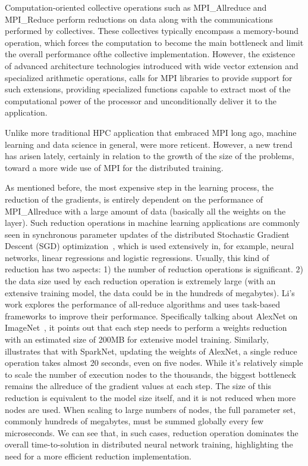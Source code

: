 \documentclass[sigconf]{acmart}
\newcommand{\mpi}[0]{\textsc{MPI}\xspace}
\newcommand{\sve}[0]{\textsc{SVE}\xspace}
\begin{document}
Computation-oriented collective operations such as MPI\_Allreduce and MPI\_Reduce perform reductions on
data along with the communications performed by collectives.
These collectives typically encompass a memory-bound operation, which forces
the computation to become the main bottleneck and limit the overall performance ofthe collective implementation.
However, the existence of advanced architecture technologies introduced
with wide vector extension and specialized arithmetic operations, calls for
MPI libraries to provide support for such extensions, providing specialized functions
capable to extract most of the computational power of the processor and unconditionally deliver it to the application.


Unlike more traditional HPC application that embraced MPI long ago,
machine learning and data science in general, were more reticent. However,
a new trend has arisen lately, certainly in relation to the growth
of the size of the problems, toward a more wide use of \mpi for the distributed training.

As mentioned before, the most expensive step in the learning process, the reduction of the gradients, is entirely dependent on the performance of MPI\_Allreduce with a large amount of data (basically all the weights on the layer).
Such reduction operations in machine learning applications
are commonly seen in synchronous parameter updates of the distributed Stochastic
Gradient Descent (SGD) optimization~\cite{sgd10}, which is used extensively
in, for example, neural networks, linear regressions and logistic
regressions. Usually, this kind of reduction has two aspects: 1) the number of reduction
operations is significant. 2) the data size used by each reduction operation is extremely large (with an extensive training model, the data could be in the hundreds of megabytes).
%
Li's~\cite{inproceedings} work explores the performance of all-reduce algorithms
and uses task-based frameworks to improve their performance. Specifically talking about AlexNet on ImageNet~\cite{NIPS2012_4824}, it points out that
each step needs to perform a weights reduction with an estimated size
of 200MB for extensive model training.
%
Similarly, \cite{moritz2015sparknet}
illustrates that with SparkNet, updating the weights of AlexNet, a single reduce
operation takes almost 20 seconds, even on five nodes. While it's relatively simple to scale
the number of execution nodes to the thousands, the biggest bottleneck remains the allreduce of
the gradient values at each step. The size of this reduction is equivalent
to the model size itself, and it is not reduced when more
nodes are used. When scaling to large numbers of nodes, the full parameter set, commonly hundreds of
megabytes, must be summed globally every few microseconds. We can see that, in such cases,
reduction operation dominates the overall time-to-solution in distributed neural network
training, highlighting the need for a more efficient reduction implementation.
\end{document}
